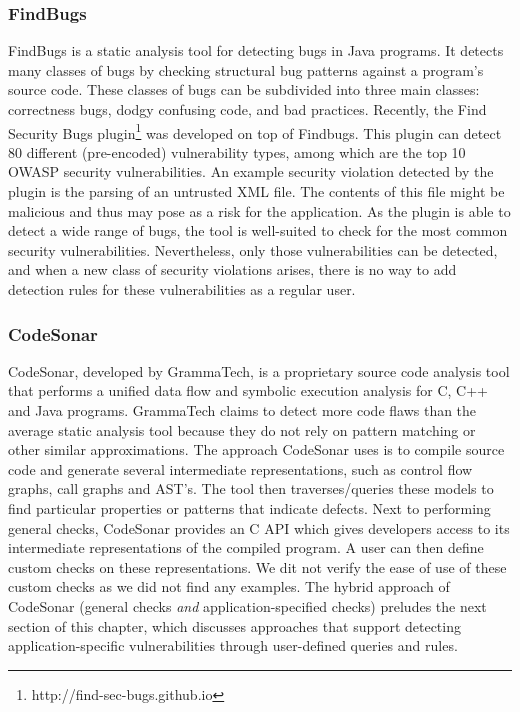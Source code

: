 \subsubsection*{FindBugs}

FindBugs\cite{Findbugs} is a static analysis tool for detecting bugs in Java programs. It detects many classes of bugs by checking structural bug patterns against a program's source code. These classes of bugs can be subdivided into three main classes: correctness bugs, dodgy confusing code, and bad practices. Recently, the Find Security Bugs plugin\footnote{http://find-sec-bugs.github.io} was developed on top of Findbugs. This plugin can detect 80 different (pre-encoded) vulnerability types, among which are the top 10 OWASP security vulnerabilities. An example security violation detected by the plugin is the parsing of an untrusted XML file. The contents of this file might be malicious and thus may pose as a risk for the application. As the plugin is able to detect a wide range of bugs, the tool is well-suited to check for the most common security vulnerabilities. Nevertheless, only those vulnerabilities can be detected, and when a new class of security violations arises, there is no way to add detection rules for these vulnerabilities as a regular user.

\subsubsection*{CodeSonar}
CodeSonar\cite{CodeSonar}, developed by GrammaTech, is a proprietary source code analysis tool that performs a unified data flow and symbolic execution analysis for C, C++ and Java programs. GrammaTech claims to detect more code flaws than the average static analysis tool because they do not rely on pattern matching or other similar approximations. The approach CodeSonar uses is to compile source code and generate several intermediate representations, such as control flow graphs, call graphs and AST's. The tool then traverses/queries these models to find particular properties or patterns that indicate defects. Next to performing general checks, CodeSonar provides an C API which gives developers access to its intermediate representations of the compiled program. A user can then define custom checks on these representations. We dit not verify the ease of use of these custom checks as we did not find any examples. The hybrid approach of CodeSonar (general checks \textit{and} application-specified checks) preludes the next section of this chapter, which discusses approaches that support detecting application-specific vulnerabilities through user-defined queries and rules.


